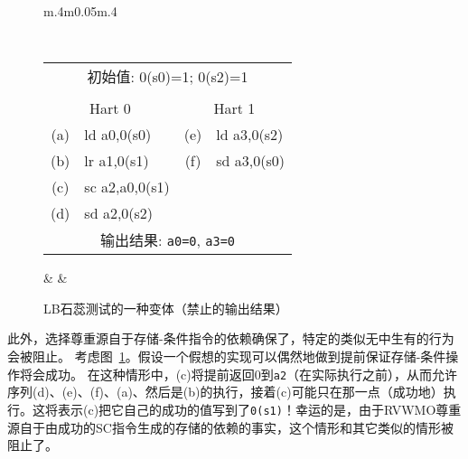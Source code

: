 \begin{figure}[h!]
  \centering
  \begin{tabular}{m{.4\linewidth}m{0.05\linewidth}m{.4\linewidth}}
  {
    \tt\small
    \begin{tabular}{cl||cl}
    \multicolumn{4}{c}{初始值: 0(s0)=1; 0(s2)=1} \\
    \\
    \multicolumn{2}{c}{Hart 0} & \multicolumn{2}{c}{Hart 1} \\
    \hline
      (a) & ld a0,0(s0)    & (e) & ld a3,0(s2) \\
      (b) & lr a1,0(s1)    & (f) & sd a3,0(s0) \\
      (c) & sc a2,a0,0(s1) &                    \\
      (d) & sd a2,0(s2)    &                    \\
      \hline
      \multicolumn{4}{c}{输出结果: {\tt a0=0}, {\tt a3=0}}
    \end{tabular}
  }
  & &
  
  \end{tabular}
  \caption{LB石蕊测试的一种变体（禁止的输出结果）  
  }
  \label{fig:litmus:successdeps}
\end{figure}

此外，选择尊重源自于存储-条件指令的依赖确保了，特定的类似无中生有的行为会被阻止。
考虑图~\ref{fig:litmus:successdeps}。假设一个假想的实现可以偶然地做到提前保证存储-条件操作将会成功。
在这种情形中，(c)将提前返回0到{\tt a2}（在实际执行之前），从而允许序列(d)、(e)、(f)、(a)、然后是(b)的执行，接着(c)可能只在那一点（成功地）执行。这将表示(c)把它自己的成功的值写到了{\tt 0(s1)}！幸运的是，由于RVWMO尊重源自于由成功的SC指令生成的存储的依赖的事实，这个情形和其它类似的情形被阻止了。

